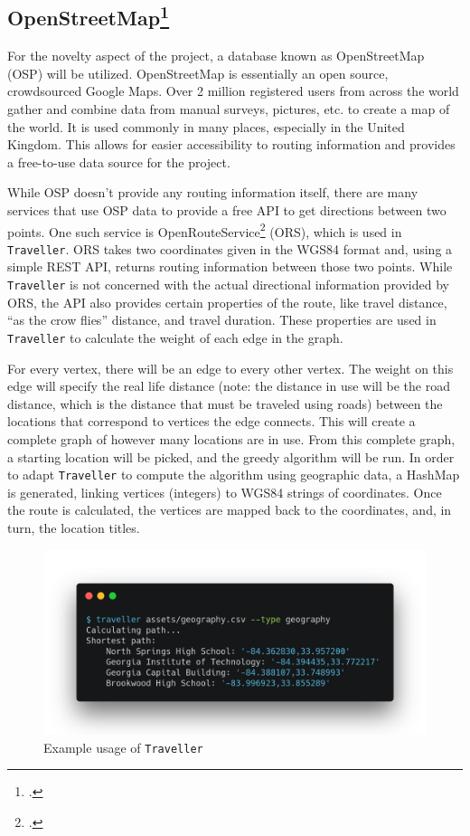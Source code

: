 \documentclass{article}
\begin{document}
  \subsection{OpenStreetMap\footcite{openstreetmap_foundation_openstreetmap:_nodate}}
    For the novelty aspect of the project, a database known as OpenStreetMap (OSP) will be utilized. OpenStreetMap is essentially an open source, crowdsourced Google Maps. Over 2 million registered users from across the world gather and combine data from manual surveys, pictures, etc. to create a map of the world. It is used commonly in many places, especially in the United Kingdom. This allows for easier accessibility to routing information and provides a free-to-use data source for the project.
    \par While OSP doesn't provide any routing information itself, there are many services that use OSP data to provide a free API to get directions between two points. One such service is OpenRouteService\footcite{the_heidelberg_institute_for_geoinformation_technology_openrouteservice_2018} (ORS), which is used in \texttt{Traveller}. ORS takes two coordinates given in the WGS84 format and, using a simple REST API, returns routing information between those two points. While \texttt{Traveller} is not concerned with the actual directional information provided by ORS, the API also provides certain properties of the route, like travel distance, ``as the crow flies'' distance, and travel duration. These properties are used in \texttt{Traveller} to calculate the weight of each edge in the graph.
    \par For every vertex, there will be an edge to every other vertex. The weight on this edge will specify the real life distance (note: the distance in use will be the road distance, which is the distance that must be traveled using roads) between the locations that correspond to vertices the edge connects. This will create a complete graph of however many locations are in use. From this complete graph, a starting location will be picked, and the greedy algorithm will be run. In order to adapt \texttt{Traveller} to compute the algorithm using geographic data, a HashMap is generated, linking vertices (integers) to WGS84 strings of coordinates. Once the route is calculated, the vertices are mapped back to the coordinates, and, in turn, the location titles.
    \begin{figure}[H]
      \centering
      \includegraphics[width=.6\textwidth]{figures/traveller-scrot.png}
      \caption{Example usage of \texttt{Traveller}}
    \end{figure}
\end{document}
